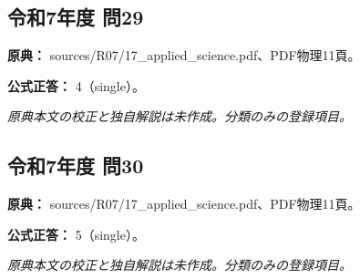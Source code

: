 \subsection{令和7年度 問29}
\label{q:r07-reg-applied-29}

\noindent\textbf{原典：} sources/R07/17\_applied\_science.pdf、PDF物理11頁。

\textbf{公式正答：} 4（single）。

\par\textit{原典本文の校正と独自解説は未作成。分類のみの登録項目。}

\subsection{令和7年度 問30}
\label{q:r07-reg-applied-30}

\noindent\textbf{原典：} sources/R07/17\_applied\_science.pdf、PDF物理11頁。

\textbf{公式正答：} 5（single）。

\par\textit{原典本文の校正と独自解説は未作成。分類のみの登録項目。}
